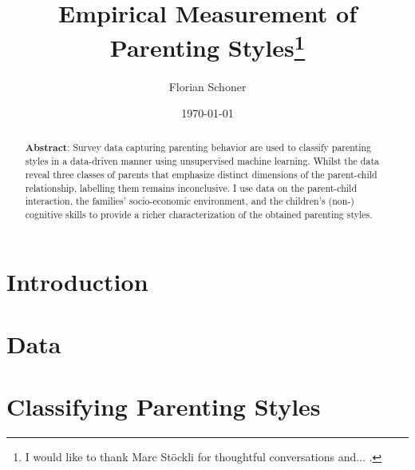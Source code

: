\documentclass[a4paper,captions=tableheading,12pt]{scrartcl}
\title{Empirical Measurement of Parenting Styles\thanks{I would like to thank Marc Stöckli for thoughtful conversations and... .}}
\author{
	\large Florian Schoner
}
\date{\large \today}
\begin{document}
	\maketitle
	\thispagestyle{empty}
	\begin{abstract}
		\noindent\textbf{Abstract}: Survey data capturing parenting behavior are used to classify parenting styles in a data-driven manner using unsupervised machine learning. Whilst the data reveal three classes of parents that emphasize distinct dimensions of the parent-child relationship, labelling them remains inconclusive. I use data on the parent-child interaction, the families' socio-economic environment, and the children's (non-) cognitive skills to provide a richer characterization of the obtained parenting styles. 
		\bigskip
	\end{abstract}
	\pagebreak
	
	\section{Introduction} \label{sec:intro}
	
	
	\section{Data} \label{sec:data}
	
	
	\section{Classifying Parenting Styles} \label{sec:classifying}
	
	
\end{document}

